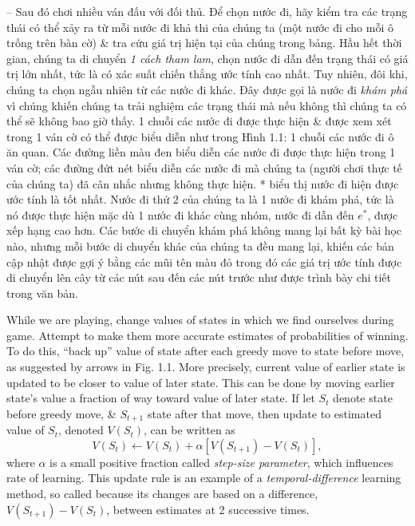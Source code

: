 \documentclass{article}
\begin{document}
\begin{itemize}
\begin{itemize}
        -- Sau đó chơi nhiều ván đấu với đối thủ. Để chọn nước đi, hãy kiểm tra các trạng thái có thể xảy ra từ mỗi nước đi khả thi của chúng ta (một nước đi cho mỗi ô trống trên bàn cờ) \& tra cứu giá trị hiện tại của chúng trong bảng. Hầu hết thời gian, chúng ta di chuyển {\it 1 cách tham lam}, chọn nước đi dẫn đến trạng thái có giá trị lớn nhất, tức là có xác suất chiến thắng ước tính cao nhất. Tuy nhiên, đôi khi, chúng ta chọn ngẫu nhiên từ các nước đi khác. Đây được gọi là nước đi {\it khám phá} vì chúng khiến chúng ta trải nghiệm các trạng thái mà nếu không thì chúng ta có thể sẽ không bao giờ thấy. 1 chuỗi các nước đi được thực hiện \& được xem xét trong 1 ván cờ có thể được biểu diễn như trong {\sf Hình 1.1: 1 chuỗi các nước đi ô ăn quan. Các đường liền màu đen biểu diễn các nước đi được thực hiện trong 1 ván cờ; các đường đứt nét biểu diễn các nước đi mà chúng ta (người chơi thực tế của chúng ta) đã cân nhắc nhưng không thực hiện. * biểu thị nước đi hiện được ước tính là tốt nhất. Nước đi thứ 2 của chúng ta là 1 nước đi khám phá, tức là nó được thực hiện mặc dù 1 nước đi khác cùng nhóm, nước đi dẫn đến $e^*$, được xếp hạng cao hơn. Các bước di chuyển khám phá không mang lại bất kỳ bài học nào, nhưng mỗi bước di chuyển khác của chúng ta đều mang lại, khiến các bản cập nhật được gợi ý bằng các mũi tên màu đỏ trong đó các giá trị ước tính được di chuyển lên cây từ các nút sau đến các nút trước như được trình bày chi tiết trong văn bản.}

        While we are playing, change values of states in which we find ourselves during game. Attempt to make them more accurate estimates of probabilities of winning. To do this, ``back up'' value of state after each greedy move to state before move, as suggested by arrows in Fig. 1.1. More precisely, current value of earlier state is updated to be closer to value of later state. This can be done by moving earlier state's value a fraction of way toward value of later state. If let $S_t$ denote state before greedy move, \& $S_{t+1}$ state after that move, then update to estimated value of $S_t$, denoted $V(S_t)$, can be written as
        \begin{equation*}
            V(S_t)\leftarrow V(S_t) + \alpha[V(S_{t+1}) - V(S_t)],
        \end{equation*}
        where $\alpha$ is a small positive fraction called {\it step-size parameter}, which influences rate of learning. This update rule is an example of a {\it temporal-difference} learning method, so called because its changes are based on a difference, $V(S_{t+1}) - V(S_t)$, between estimates at 2 successive times.


\end{itemize}
\end{itemize}
\end{document}
